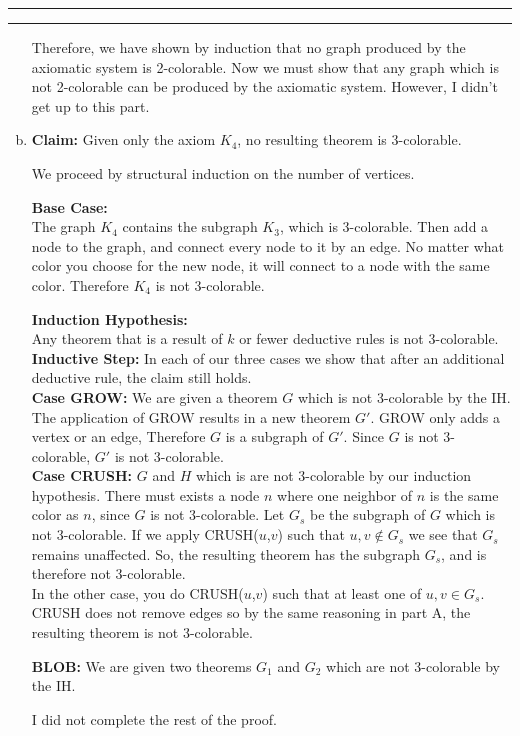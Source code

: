 \documentclass[11pt]{article}
\newcounter{questionCounter}
\newcounter{partCounter}[questionCounter]
\newenvironment{question}[2][\arabic{questionCounter}]{%
    \setcounter{partCounter}{0}%
    \vspace{.25in} \hrule \vspace{0.5em}%
        \noindent{\bf #2}%
    \vspace{0.8em} \hrule \vspace{.10in}%
    \addtocounter{questionCounter}{1}%
}{}
\begin{document}
\begin{question}{The Blob}
\begin{enumerate}[a.]
Therefore, we have shown by induction that no graph produced by the axiomatic system is 2-colorable. Now we must show that 
any graph which is not 2-colorable can be produced by the axiomatic system. However, I didn't get up to this part.

\item
\textbf{Claim:} Given only the axiom $K_4$, no resulting theorem is 3-colorable.

We proceed by structural induction on the number of vertices.

\textbf{Base Case: }\\
The graph $K_4$ contains the subgraph $K_3$, which is 3-colorable. Then add a node to the graph, and connect every node to it by an edge. 
No matter what color you choose for the new node, it will connect to a node with the same color. Therefore $K_4$ is not 3-colorable.

\textbf{Induction Hypothesis: }\\
Any theorem that is a result of $k$ or fewer deductive rules is not $3$-colorable. \\

\textbf{Inductive Step: } In each of our three cases we show that after an additional deductive rule, the claim still holds.\\

\textbf{Case GROW: } We are given a theorem $G$ which is not 3-colorable by the IH. 
The application of GROW results in a new theorem $G'$. GROW only adds a vertex or an edge, 
Therefore $G$ is a subgraph of $G'$. Since $G$ is not $3$-colorable, $G'$ is not $3$-colorable. \\

\textbf{Case CRUSH: } $G$ and $H$ which is are not 3-colorable by our induction hypothesis. 
There must exists a node $n$ where one neighbor of $n$ is the same color as $n$, since $G$ is not 3-colorable. 
Let $G_s$ be the subgraph of $G$ which is not 3-colorable. If we apply CRUSH($u$,$v$) such that $u,v \notin G_s$ 
we see that $G_s$ remains unaffected. So, the resulting theorem has the subgraph $G_s$, 
and is therefore not $3$-colorable. \\
In the other case, you do CRUSH($u$,$v$) such that at least one of $u,v \in G_s$. CRUSH does not remove edges so by the same reasoning in
part A, the resulting theorem is not 3-colorable.

\textbf{BLOB: } We are given two theorems $G_1$ and $G_2$ which are not 3-colorable by the IH. 

I did not complete the rest of the proof.
\end{enumerate}
\end{question}
\end{document}
